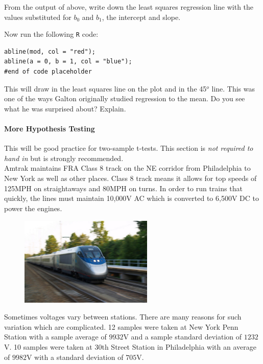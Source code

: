 \documentclass[12pt]{article}
\begin{document}
From the output of above, write down the least squares regression line with the values substituted for $b_0$ and $b_1$, the intercept and slope.

\easysubproblem Now run the following \texttt{R} code:

\begin{verbatim}
abline(mod, col = "red");
abline(a = 0, b = 1, col = "blue");
#end of code placeholder
\end{verbatim}

This will draw in  the least squares line on the plot and in  the 45$^o$ line. This was one of the ways Galton originally studied regression to the mean. Do you see what he was surprised about? Explain.
\eenum

\paragraph{More Hypothesis Testing} This will be good practice for two-sample t-tests. This section is \textit{not required to hand in} but is strongly recommended. \\

\problem Amtrak maintains FRA Class 8 track on the NE corridor from Philadelphia to New York as well as other places. Class 8 track means it allows for top speeds of 125MPH on straightaways and 80MPH on turns. In order to run trains that quickly, the lines must maintain 10,000V AC which is converted to 6,500V DC to power the engines.

\begin{figure}[htp]
\centering
\includegraphics[width=2.5in,height=1.67in]{amtrak.jpg}
\end{figure}
\FloatBarrier

Sometimes voltages vary between stations. There are many reasons for such variation which are complicated. 12 samples were taken at New York Penn Station with a sample average of $9932$V and a sample standard deviation of $1232$V. 10 samples were taken at 30th Street Station in Philadelphia with an average of $9982$V with a standard deviation of $705$V.
\end{document}
